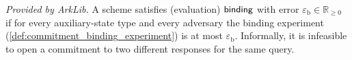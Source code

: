 \begin{definition}
  \label{def:commitment_binding}
  \mathlibok
  \textit{Provided by ArkLib.}
  A scheme satisfies (evaluation) $\mathsf{binding}$ with error
  $\varepsilon_{\mathrm{b}} \in \mathbb{R}_{\ge 0}$ if for every auxiliary-state type and
  every adversary the binding experiment (\cref{def:commitment_binding_experiment}) is at
  most $\varepsilon_{\mathrm{b}}$. Informally, it is infeasible to open a commitment to two
  different responses for the same query.
\end{definition}

